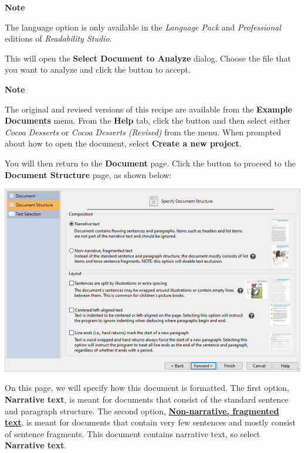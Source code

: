 \documentclass[
]{book}
\newenvironment{notesection}
    {
    \begin{tcolorbox}[colframe=mediumblue,colback=lightblue,coltext=mediumblue,arc=3mm]
    \faLightbulb[regular] \textbf{Note} \newline
    }
    {
    \end{tcolorbox}
    }
\theoremstyle{definition}
\theoremstyle{definition}
\theoremstyle{definition}
\theoremstyle{definition}
\theoremstyle{remark}
\begin{document}
\begin{notesection}
The language option is only available in the \emph{Language Pack} and \emph{Professional} editions of \emph{Readability Studio}.

\end{notesection}

This will open the \textbf{Select Document to Analyze} dialog. Choose the file that you want to analyze and click the  button to accept.

\begin{notesection}
The original and revised versions of this recipe are available from the \textbf{Example Documents} menu. From the \textbf{Help} tab, click the  button and then select either \emph{Cocoa Desserts} or \emph{Cocoa Desserts (Revised)} from the menu. When prompted about how to open the document, select \textbf{Create a new project}.

\end{notesection}

You will then return to the \textbf{Document} page. Click the  button to proceed to the \textbf{Document Structure} page, as shown below:

\includegraphics{Images/wizarddocstructure.png}

On this page, we will specify how this document is formatted. The first option, \textbf{Narrative text}, is meant for documents that consist of the standard sentence and paragraph structure. The second option, \protect\hyperlink{framented-text}{\textbf{Non-narrative, fragmented text}}, is meant for documents that contain very few sentences and mostly consist of sentence fragments. This document contains narrative text, so select \textbf{Narrative text}.
\end{document}

